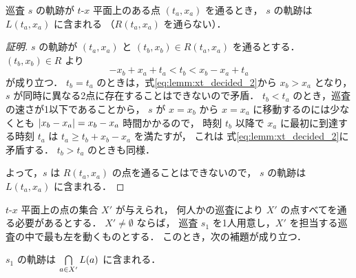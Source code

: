 \begin{lemm}
	\label{lemm:xt_decided_2}
	巡査 $s$ の軌跡が $t$-$x$ 平面上のある点 $(t_a,x_a)$ を通るとき，
	$s$ の軌跡は $L(t_a,x_a)$ に含まれる （$R(t_a,x_a)$ を通らない）．
\end{lemm}

\begin{proof}[証明]
	$s$ の軌跡が $(t_a,x_a)$ と $(t_b,x_b) \in R(t_a,x_a)$ を通るとする．
	$(t_b, x_b) \in R$ より
	\begin{equation}
		\label{eq:lemm:xt_decided_2}
		-x_b + x_a + t_a < t_b < x_b - x_a + t_a
	\end{equation}
	が成り立つ．
	$t_b = t_a$ のときは，式\ref{eq:lemm:xt_decided_2}から $x_b > x_a$ となり，
	$s$ が同時に異なる2点に存在することはできないので矛盾．
	$t_b < t_a$ のとき，巡査の速さが1以下であることから，
	$s$ が $x = x_b$ から $x = x_a$ に移動するのには少なくとも
	$|{x_b - x_a}| = x_b - x_a$ 時間かかるので，
	時刻 $t_b$ 以降で $x_a$ に最初に到達する時刻 $t_a$ は
	$t_a \geq t_b + x_b - x_a$ を満たすが，
	これは 式\ref{eq:lemm:xt_decided_2}に矛盾する．
	$t_b > t_a$ のときも同様．

	よって，$s$ は $R(t_a,x_a)$ の点を通ることはできないので，
	$s$ の軌跡は $L(t_a,x_a)$ に含まれる．
\end{proof}


$t$-$x$ 平面上の点の集合 $X'$ が与えられ，
何人かの巡査により $X'$ の点すべてを通る必要があるとする．
$X' \neq \emptyset$ ならば，
巡査 $s_1$ を1人用意し，$X'$ を担当する巡査の中で最も左を動くものとする．
このとき，次の補題が成り立つ．


\begin{lemm}
	\label{lemm:xt_decided_2_3}
	$s_1$ の軌跡は $\bigcap\limits_{a \in X'} L(a)$ に含まれる．
\end{lemm}


